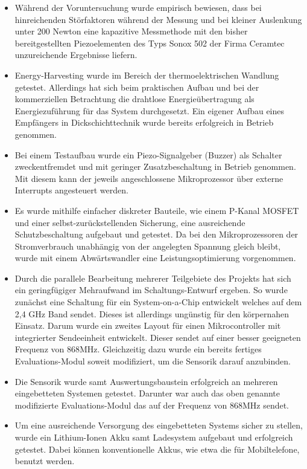 \documentclass[12pt]{scrreprt} %
\begin{document}
\begin{itemize}
\item
Während der Voruntersuchung wurde empirisch bewiesen, dass bei hinreichenden Störfaktoren während der Messung und bei kleiner Auslenkung unter 200 Newton eine kapazitive Messmethode mit den bisher bereitgestellten Piezoelementen des Typs Sonox 502 der Firma Ceramtec unzureichende Ergebnisse liefern. 
\item
Energy-Harvesting wurde im Bereich der thermoelektrischen Wandlung getestet. Allerdings hat sich beim praktischen Aufbau und bei der kommerziellen Betrachtung die drahtlose Energieübertragung als Energiezuführung für das System durchgesetzt. Ein eigener Aufbau eines Empfängers in Dickschichttechnik wurde bereits erfolgreich in Betrieb genommen. 
\item
Bei einem Testaufbau wurde ein Piezo-Signalgeber (Buzzer) als Schalter zweckentfremdet und mit geringer Zusatzbeschaltung in Betrieb genommen. Mit diesem kann der jeweils angeschlossene Mikroprozessor über externe Interrupts angesteuert werden.
\item
Es wurde mithilfe einfacher diskreter Bauteile, wie einem P-Kanal MOSFET und einer selbst-zurückstellenden Sicherung, eine ausreichende Schutzbeschaltung aufgebaut und getestet. Da bei den Mikroprozessoren der Stromverbrauch unabhängig von der angelegten Spannung gleich bleibt, wurde mit einem Abwärtswandler eine Leistungsoptimierung vorgenommen.
\item
Durch die parallele Bearbeitung mehrerer Teilgebiete des Projekts hat sich ein geringfügiger Mehraufwand im Schaltungs-Entwurf ergeben. So wurde zunächst eine Schaltung für ein System-on-a-Chip entwickelt welches auf dem 2,4 GHz Band sendet. Dieses ist allerdings ungünstig für den körpernahen Einsatz. Darum wurde ein zweites Layout für einen Mikrocontroller mit integrierter Sendeeinheit entwickelt. Dieser sendet auf einer besser geeigneten Frequenz von 868MHz. Gleichzeitig dazu wurde ein bereits fertiges Evaluations-Modul soweit modifiziert, um die Sensorik darauf anzubinden. 
\item
Die Sensorik wurde samt Auswertungsbaustein erfolgreich an mehreren eingebetteten Systemen getestet. Darunter war auch das oben genannte modifizierte Evaluations-Modul das auf der Frequenz von 868MHz sendet. 
\item
Um eine ausreichende Versorgung des eingebetteten Systems sicher zu stellen, wurde ein Lithium-Ionen Akku samt Ladesystem aufgebaut und erfolgreich getestet. Dabei können konventionelle Akkus, wie etwa die für Mobiltelefone, benutzt werden.

\end{itemize}
\end{document}

